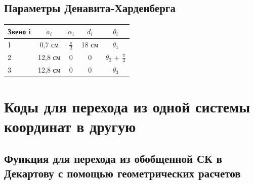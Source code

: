 \documentclass{article}
\begin{document}
\subsection*{Параметры Денавита-Харденберга}
\begin{tabular}{|l||c|c|c|c|}
\hline
Звено i & $a_i$ & $\alpha_i$ & $d_i$ & $\theta_i$\\
\hline
\hline
1 & 0,7 см & $\frac{\pi}2$ & 18 см & $\theta_1$  \\ \hline
2 & 12,8 см & 0 & 0 & $\theta_2$ + $\frac{\pi}2$ \\ \hline
3 & 12,8 см & 0 & 0 & $\theta_3$\\
\hline
\end{tabular}

\section{Коды для перехода из одной системы координат в другую}
\subsection{Функция для перехода из обобщенной СК в Декартову с помощью геометрических расчетов}
\end{document}
